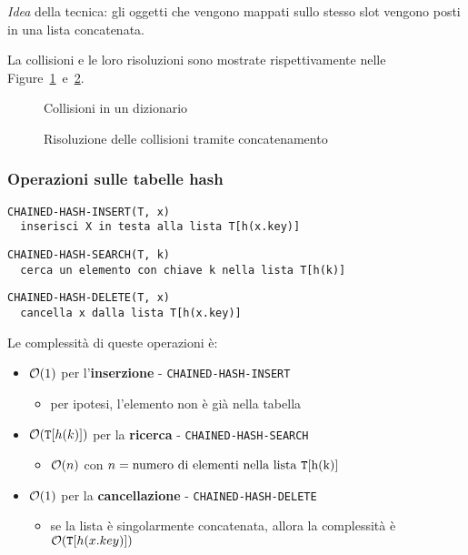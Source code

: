 \documentclass[italian, 10pt]{article}
\begin{document}
\textit{Idea} della tecnica: gli oggetti che vengono mappati sullo stesso slot vengono posti in una lista concatenata.

\bigskip
La collisioni e le loro risoluzioni sono mostrate rispettivamente nelle Figure~\ref{fig:collisioni-dizionario}~e~\ref{fig:risoluzione-collisioni-dizionario}.

\begin{figure}[htbp]
  \bigskip
  \centering
  \caption{Collisioni in un dizionario}
  \label{fig:collisioni-dizionario}
  \bigskip
\end{figure}

\begin{figure}[htbp]
  \bigskip
  \centering
  \caption{Risoluzione delle collisioni tramite concatenamento}
  \label{fig:risoluzione-collisioni-dizionario}
  \bigskip
\end{figure}

\subsubsection{Operazioni sulle tabelle hash}

\begin{lstlisting}[style=pseudocode, numbers=none]
CHAINED-HASH-INSERT(T, x)
  inserisci X in testa alla lista T[h(x.key)]
\end{lstlisting}
\begin{lstlisting}[style=pseudocode, numbers=none]
CHAINED-HASH-SEARCH(T, k)
  cerca un elemento con chiave k nella lista T[h(k)]
\end{lstlisting}
\begin{lstlisting}[style=pseudocode, numbers=none]
CHAINED-HASH-DELETE(T, x)
  cancella x dalla lista T[h(x.key)]
\end{lstlisting}

Le complessità di queste operazioni è:

\begin{itemize}
  \item \(\mathcal{O}(1)\) per l'\textbf{inserzione} - \texttt{CHAINED-HASH-INSERT}
        \begin{itemize}
          \item per ipotesi, l'elemento non è già nella tabella
        \end{itemize}
  \item \(\mathcal{O}(\texttt{T}[h(k)])\) per la \textbf{ricerca} - \texttt{CHAINED-HASH-SEARCH}
  \begin{itemize}
    \item \(\mathcal{O}(n)\) con \(n = \text{numero di elementi nella lista \texttt{T}[h(k)]}\)
  \end{itemize}
  \item \(\mathcal{O}(1)\) per la \textbf{cancellazione} - \texttt{CHAINED-HASH-DELETE}
        \begin{itemize}
          \item se la lista è singolarmente concatenata, allora la complessità è \(\mathcal{O}(\texttt{T}[h(x.key)])\)
        \end{itemize}
\end{itemize}
\end{document}

